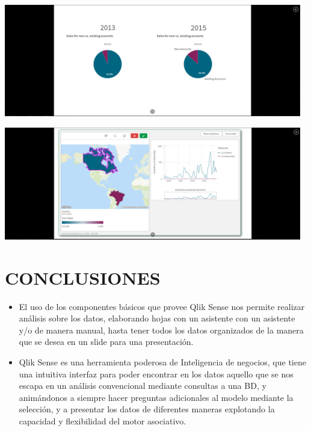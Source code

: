 \documentclass[12pt,letterpaper]{article}
\newcommand\tab[1][1cm]{\hspace*{#1}}
\begin{document}
\begin{enumerate}[\tab 1.]
        \begin{center}
            \includegraphics[width=13cm]{./img/img49.1.png}
        \end{center}
        \begin{center}
            \includegraphics[width=13cm]{./img/img49.2.png}
        \end{center}
    \end{enumerate}
    
    \newpage
    \section{CONCLUSIONES}
    \begin{itemize}
        \item El uso de los componentes básicos que provee Qlik Sense nos permite realizar análisis sobre los datos, elaborando hojas con un asistente con un asistente y/o de manera manual, hasta tener todos los datos organizados de la manera que se desea en un slide para una presentación.
        \item Qlik Sense es una herramienta poderosa de Inteligencia de negocios, que tiene una intuitiva interfaz para poder encontrar en los datos aquello que se nos escapa en un análisis convencional mediante consultas a una BD, y animándonos a siempre hacer preguntas adicionales al modelo mediante la selección, y a presentar los datos de diferentes maneras explotando la capacidad y flexibilidad del motor asociativo.
    \end{itemize}
\end{document}
